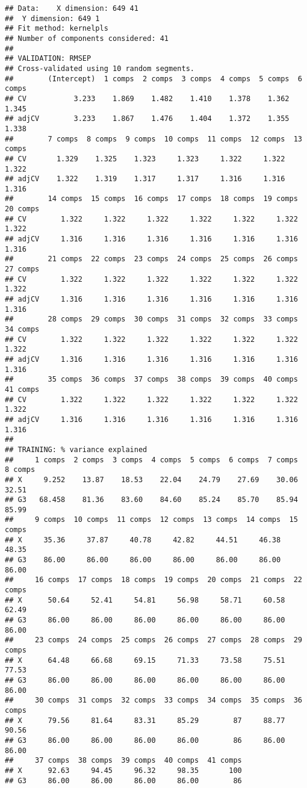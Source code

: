 \documentclass[
]{article}
\begin{document}
\begin{verbatim}
## Data:    X dimension: 649 41 
##  Y dimension: 649 1
## Fit method: kernelpls
## Number of components considered: 41
## 
## VALIDATION: RMSEP
## Cross-validated using 10 random segments.
##        (Intercept)  1 comps  2 comps  3 comps  4 comps  5 comps  6 comps
## CV           3.233    1.869    1.482    1.410    1.378    1.362    1.345
## adjCV        3.233    1.867    1.476    1.404    1.372    1.355    1.338
##        7 comps  8 comps  9 comps  10 comps  11 comps  12 comps  13 comps
## CV       1.329    1.325    1.323     1.323     1.322     1.322     1.322
## adjCV    1.322    1.319    1.317     1.317     1.316     1.316     1.316
##        14 comps  15 comps  16 comps  17 comps  18 comps  19 comps  20 comps
## CV        1.322     1.322     1.322     1.322     1.322     1.322     1.322
## adjCV     1.316     1.316     1.316     1.316     1.316     1.316     1.316
##        21 comps  22 comps  23 comps  24 comps  25 comps  26 comps  27 comps
## CV        1.322     1.322     1.322     1.322     1.322     1.322     1.322
## adjCV     1.316     1.316     1.316     1.316     1.316     1.316     1.316
##        28 comps  29 comps  30 comps  31 comps  32 comps  33 comps  34 comps
## CV        1.322     1.322     1.322     1.322     1.322     1.322     1.322
## adjCV     1.316     1.316     1.316     1.316     1.316     1.316     1.316
##        35 comps  36 comps  37 comps  38 comps  39 comps  40 comps  41 comps
## CV        1.322     1.322     1.322     1.322     1.322     1.322     1.322
## adjCV     1.316     1.316     1.316     1.316     1.316     1.316     1.316
## 
## TRAINING: % variance explained
##     1 comps  2 comps  3 comps  4 comps  5 comps  6 comps  7 comps  8 comps
## X     9.252    13.87    18.53    22.04    24.79    27.69    30.06    32.51
## G3   68.458    81.36    83.60    84.60    85.24    85.70    85.94    85.99
##     9 comps  10 comps  11 comps  12 comps  13 comps  14 comps  15 comps
## X     35.36     37.87     40.78     42.82     44.51     46.38     48.35
## G3    86.00     86.00     86.00     86.00     86.00     86.00     86.00
##     16 comps  17 comps  18 comps  19 comps  20 comps  21 comps  22 comps
## X      50.64     52.41     54.81     56.98     58.71     60.58     62.49
## G3     86.00     86.00     86.00     86.00     86.00     86.00     86.00
##     23 comps  24 comps  25 comps  26 comps  27 comps  28 comps  29 comps
## X      64.48     66.68     69.15     71.33     73.58     75.51     77.53
## G3     86.00     86.00     86.00     86.00     86.00     86.00     86.00
##     30 comps  31 comps  32 comps  33 comps  34 comps  35 comps  36 comps
## X      79.56     81.64     83.31     85.29        87     88.77     90.56
## G3     86.00     86.00     86.00     86.00        86     86.00     86.00
##     37 comps  38 comps  39 comps  40 comps  41 comps
## X      92.63     94.45     96.32     98.35       100
## G3     86.00     86.00     86.00     86.00        86
\end{verbatim}
\end{document}
